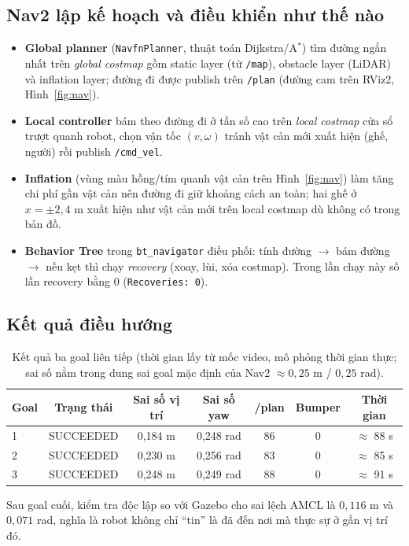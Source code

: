 \documentclass[a4paper,12pt]{article}
\begin{document}
\subsection{Nav2 lập kế hoạch và điều khiển như thế nào}
\begin{itemize}[nosep]
  \item \textbf{Global planner} (\texttt{NavfnPlanner}, thuật toán Dijkstra/A$^*$) tìm đường ngắn nhất trên \emph{global costmap} gồm static layer (từ \texttt{/map}), obstacle layer (LiDAR) và inflation layer; đường đi được publish trên \texttt{/plan} (đường cam trên RViz2, Hình~\ref{fig:nav}).
  \item \textbf{Local controller} bám theo đường đi ở tần số cao trên \emph{local costmap} cửa sổ trượt quanh robot, chọn vận tốc $(v,\omega)$ tránh vật cản mới xuất hiện (ghế, người) rồi publish \texttt{/cmd\_vel}.
  \item \textbf{Inflation} (vùng màu hồng/tím quanh vật cản trên Hình~\ref{fig:nav}) làm tăng chi phí gần vật cản nên đường đi giữ khoảng cách an toàn; hai ghế ở $x=\pm2{,}4$ m xuất hiện như vật cản mới trên local costmap dù không có trong bản đồ.
  \item \textbf{Behavior Tree} trong \texttt{bt\_navigator} điều phối: tính đường $\to$ bám đường $\to$ nếu kẹt thì chạy \emph{recovery} (xoay, lùi, xóa costmap). Trong lần chạy này số lần recovery bằng 0 (\texttt{Recoveries: 0}).
\end{itemize}

\subsection{Kết quả điều hướng}
\begin{table}[htbp]
\centering\small
\begin{tabular}{lcccccc}
\toprule
\textbf{Goal} & \textbf{Trạng thái} & \textbf{Sai số vị trí} & \textbf{Sai số yaw} & \textbf{/plan} & \textbf{Bumper} & \textbf{Thời gian} \\\midrule
1 & SUCCEEDED & 0,184 m & 0,248 rad & 86 & 0 & $\approx$ 88 s \\
2 & SUCCEEDED & 0,230 m & 0,256 rad & 83 & 0 & $\approx$ 85 s \\
3 & SUCCEEDED & 0,248 m & 0,249 rad & 88 & 0 & $\approx$ 91 s \\\bottomrule
\end{tabular}
\caption{Kết quả ba goal liên tiếp (thời gian lấy từ mốc video, mô phỏng thời gian thực; sai số nằm trong dung sai goal mặc định của Nav2 $\approx 0{,}25$ m / $0{,}25$ rad).}
\end{table}
Sau goal cuối, kiểm tra độc lập so với Gazebo cho sai lệch AMCL là $0{,}116$ m và $0{,}071$ rad, nghĩa là robot không chỉ ``tin'' là đã đến nơi mà thực sự ở gần vị trí đó.
\end{document}
